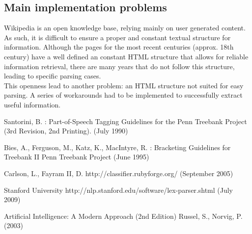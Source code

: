 \documentclass{llncs}
\begin{document}
\subsection{Main implementation problems}

Wikipedia is an open knowledge base, relying mainly on user generated content. As such, it is difficult to ensure a proper and constant textual structure for information. Although the pages for the most recent centuries (approx. 18th century) have a well defined an constant HTML structure that allows for reliable information retrieval, there are many years that do not follow this structure, leading to specific parsing cases.\\

This openness lead to another problem: an HTML structure not suited for easy parsing. A series of workarounds had to be implemented to successfully extract useful information.

\newpage
%
%
\begin{thebibliography}{}
%
Santorini, B. :
Part-of-Speech Tagging Guidelines for the
Penn Treebank Project (3rd Revision, 2nd Printing).
(July 1990)

Bies, A., Ferguson, M., Katz, K., MacIntyre, R. :
Bracketing Guidelines for Treebank II
Penn Treebank Project
(June 1995)

Carlson, L., Fayram II, D.
http://classifier.rubyforge.org/
(September 2005)

Stanford University
http://nlp.stanford.edu/software/lex-parser.shtml
(July 2009)

Artificial Intelligence: A Modern Approach (2nd Edition)
Russel, S., Norvig, P.
(2003)

\end{thebibliography}
\end{document}
